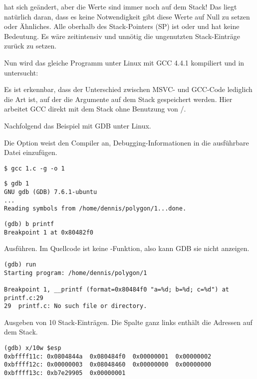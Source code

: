 \ESP hat sich geändert, aber die Werte sind immer noch auf dem Stack!
Das liegt natürlich daran, dass es keine Notwendigkeit gibt diese Werte auf Null zu setzen oder Ähnliches.
Alle oberhalb des Stack-Pointers (\ac{SP}) ist  oder \IT{\garbage{}} und hat keine Bedeutung.
Es wäre zeitintensiv und unnötig die ungenutzten Stack-Einträge zurück zu setzen.


Nun wird das gleiche Programm unter Linux mit GCC 4.4.1 kompiliert und in \IDA untersucht:



Es ist erkennbar, dass der Unterschied zwischen MSVC- und GCC-Code lediglich die Art ist,
auf der die Argumente auf dem Stack gespeichert werden.
Hier arbeitet GCC direkt mit dem Stack ohne Benutzung von \PUSH/\POP.


Nachfolgend das Beispiel mit \ac{GDB} unter Linux.

Die Option  weist den Compiler an, Debugging-Informationen in die ausführbare Datei einzufügen.

\begin{lstlisting}
$ gcc 1.c -g -o 1
\end{lstlisting}

\begin{lstlisting}
$ gdb 1
GNU gdb (GDB) 7.6.1-ubuntu
...
Reading symbols from /home/dennis/polygon/1...done.
\end{lstlisting}

\begin{lstlisting}[caption=Setzen eines Breakpoints auf \printf]
(gdb) b printf
Breakpoint 1 at 0x80482f0
\end{lstlisting}

Ausführen.
Im Quellcode ist keine \printf-Funktion, also kann \ac{GDB} sie nicht anzeigen.

\begin{lstlisting}
(gdb) run
Starting program: /home/dennis/polygon/1 

Breakpoint 1, __printf (format=0x80484f0 "a=%d; b=%d; c=%d") at printf.c:29
29	printf.c: No such file or directory.
\end{lstlisting}

Ausgeben von 10 Stack-Einträgen. Die Spalte ganz links enthält die Adressen auf dem Stack.

\begin{lstlisting}
(gdb) x/10w $esp
0xbffff11c:	0x0804844a	0x080484f0	0x00000001	0x00000002
0xbffff12c:	0x00000003	0x08048460	0x00000000	0x00000000
0xbffff13c:	0xb7e29905	0x00000001
\end{lstlisting}

